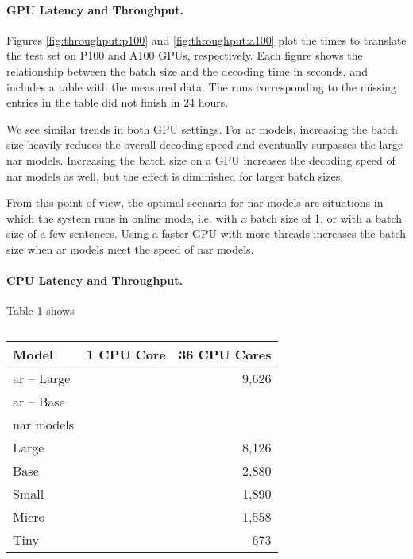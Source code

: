 \paragraph{GPU Latency and Throughput.}
Figures \ref{fig:throughput:p100} and \ref{fig:throughput:a100} plot the times
to translate the test set on P100 and A100 GPUs, respectively. Each figure
shows the relationship between the batch size and the decoding time in seconds,
and includes a table with the measured data. The runs corresponding to the
missing entries in the table did not finish in 24 hours.

We see similar trends in both GPU settings. For \ac{ar} models, increasing the
batch size heavily reduces the overall decoding speed and eventually surpasses
the large \ac{nar} models. Increasing the batch size on a GPU increases the
decoding speed of \ac{nar} models as well, but the effect is diminished for
larger batch sizes.

From this point of view, the optimal scenario for \ac{nar} models are
situations in which the system runs in online mode, i.e. with a batch size of
1, or with a batch size of a few sentences. Using a faster GPU with more
threads increases the batch size when \ac{ar} models meet the speed of \ac{nar}
models.


\paragraph{CPU Latency and Throughput.}
Table \ref{tab:exp:cpu} shows



\begin{table}
  \centering

  \begin{tabular}{lrr}
    \toprule
    Model & 1 CPU Core & 36 CPU Cores \\
    \midrule
    \acs{ar} -- Large & & 9,626 \\
    \acs{ar} -- Base & & \\
    \midrule
    \Acl{nar} models \\
    Large & & 8,126 \\
    Base  & & 2,880 \\
    Small & & 1,890 \\
    Micro & & 1,558 \\
    Tiny  & &   673 \\
    \bottomrule
  \end{tabular}

  \caption{}%
  \label{tab:exp:cpu}
\end{table}



